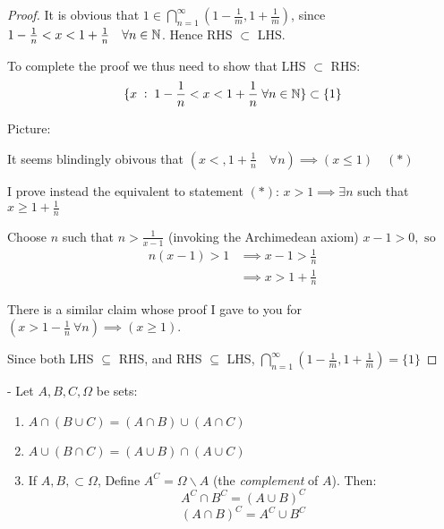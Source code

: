 \documentclass[twoside]{scrartcl}
\begin{document}
\begin{proof}

It is obvious that $1 \in \bigcap_{n=1}^{\infty} (1-\frac{1}{m}, 1 + \frac{1}{m})$, since $1- \frac{1}{n} < x < 1 + \frac{1}{n} \quad \forall n \in \mathbb{N}$. Hence RHS $\subset$ LHS. 

To complete the proof we thus need to show  that LHS $\subset$ RHS: \[\{x \; : \; 1 - \frac{1}{n} < x < 1 + \frac{1}{n} \; \forall n \in \mathbb{N}\} \subset \{1\}\]

Picture:\\
\hspace*{60pt}
\vspace*{5pt}

It seems blindingly obivous that $(x < ,1 + \frac{1}{n} \quad \forall n) \implies (x \leq 1) \quad (*)$

I prove instead the equivalent to statement $(*)$: $x> 1 \implies \exists n $ such that $ x \geq 1 + \frac{1}{n}$

Choose $n$ such that $n > \frac{1}{x-1}$ (invoking the Archimedean axiom) 
$x-1 > 0, \text{ so }$
\[\begin{aligned} n(x-1) > 1 &\implies \textstyle{x-1 > \frac{1}{n} }\\ &\implies \textstyle{x > 1 + \frac{1}{n} } \end{aligned}\]

There is a similar claim whose proof I gave to you for $(x > 1 - \frac{1}{n}~ \forall n) \implies (x \geq 1)$. 

Since both LHS $\subseteq$ RHS, and RHS $\subseteq$ LHS,  ${\bigcap_{n=1}^{\infty} (1-\frac{1}{m}, 1+ \frac{1}{m}) = \{1\}}$
\end{proof}\vspace*{5pt}



\begin{proposition} - 
Let $A, B, C, \Omega$ be sets:
\begin{enumerate}
\item $A \cap (B \cup C) = (A \cap B) \cup (A \cap C)$
\item $A \cup (B \cap C) = (A \cup B) \cap (A \cup C)$
\item If $A, B, \subset \Omega$, Define $A^C = \Omega \backslash A$ (the \emph{complement} of $A$). Then:
\[A^C \cap B^C = (A \cup B)^C\]
\[(A \cap B)^C = A^C \cup B^C\]
\end{enumerate}
\end{proposition}
\end{document}
